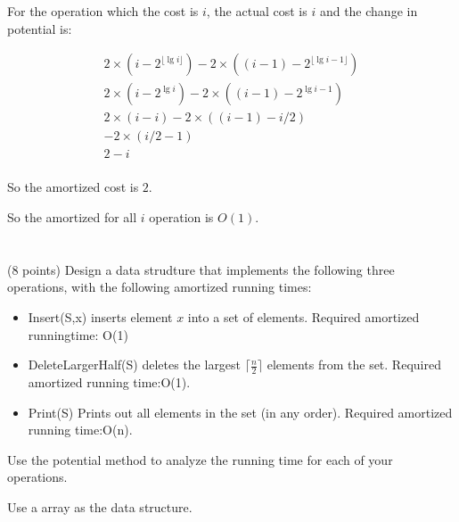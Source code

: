 \documentclass[paper=a4, fontsize=11pt]{scrartcl} %
\begin{document}
\begin{enumerate}
  For the operation which the cost is $i$, the actual cost is $i$ and
  the change in potential is:

  \begin{equation}
    \begin{split}
      2\times(i - 2^{\lfloor \lg{i}\rfloor}) - 2\times((i-1) -
      2^{\lfloor \lg{i-1}\rfloor})\\
      2\times(i - 2^{\lg{i}}) - 2\times((i-1) - 2^{\lg{i}-1})\\
      2\times(i - i) - 2\times((i-1) - i/2)\\
      -2\times(i/2-1)\\
      2-i\\
    \end{split}
  \end{equation}

  So the amortized cost is $2$.

  So the amortized for all $i$ operation is $O(1)$.
\end{enumerate}

\pagebreak

\section{}

\begin{fancyquotes}
 (8 points) Design a data strudture that implements the following
 three operations, with the following amortized running times:

 \begin{itemize}
 \item Insert(S,x) inserts element $x$ into a set of
   elements. Required amortized runningtime: O(1)
 \item DeleteLargerHalf(S) deletes the largest $\lceil
   \frac{n}{2}\rceil$ elements from the set. Required amortized
   running time:O(1).
 \item Print(S) Prints out all elements in the set (in any
   order). Required amortized running time:O(n).
 \end{itemize}

 Use the potential method to analyze the running time for each of your operations.
\end{fancyquotes}

Use a array as the data structure.
\end{document}
